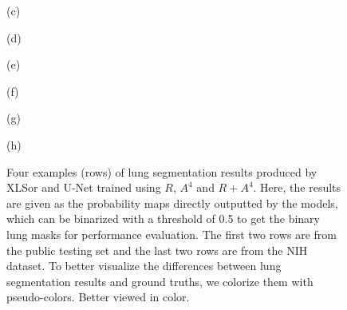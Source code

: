 \documentclass{midl} \usepackage{multirow}
\begin{document}
\begin{figure}[t!]
{	\begin{minipage}[b]{0.12\linewidth}
		\centering
		\vspace{0.2cm}
		\centerline{(c)}\medskip
	\end{minipage}
	\begin{minipage}[b]{0.12\linewidth}
		\centering
		\vspace{0.2cm}
		\centerline{(d)}\medskip
	\end{minipage}
	\begin{minipage}[b]{0.115\linewidth}
		\centering
		\vspace{0.2cm}
		\centerline{(e)}\medskip
	\end{minipage}
	\begin{minipage}[b]{0.12\linewidth}
		\centering
		\vspace{0.2cm}
		\centerline{(f)}\medskip
	\end{minipage}
	\begin{minipage}[b]{0.12\linewidth}
		\centering
		\vspace{0.2cm}
		\centerline{(g)}\medskip
	\end{minipage}
	\begin{minipage}[b]{0.115\linewidth}
		\centering
		\vspace{0.2cm}
		\centerline{(h)}\medskip
	\end{minipage}}
	\caption{Four examples (rows) of lung segmentation results produced by XLSor and U-Net trained using $R$, $A^4$ and $R+A^4$. Here, the results are given as the probability maps directly outputted by the models, which can be binarized with a threshold of 0.5 to get the binary lung masks for performance evaluation. The first two rows are from the public testing set and the last two rows are from the NIH dataset. To better visualize the differences between lung segmentation results and ground truths, we colorize them with pseudo-colors. Better viewed in color.}
	\label{fig:lung_segmentation}
\end{figure}
\end{document}
